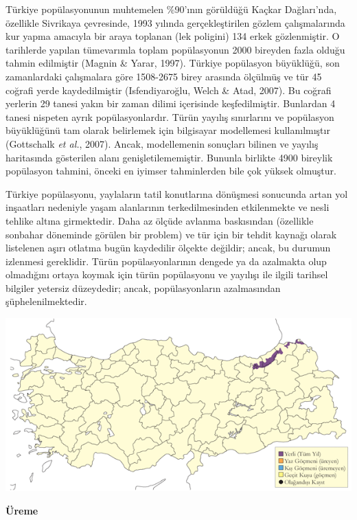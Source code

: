 \documentclass[
  a4paper,
  DIV=11,
  numbers=noendperiod]{scrreprt}
\begin{document}
Türkiye popülasyonunun muhtemelen \%90'ının görüldüğü Kaçkar
Dağları'nda, özellikle Sivrikaya çevresinde, 1993 yılında
gerçekleştirilen gözlem çalışmalarında kur yapma amacıyla bir araya
toplanan (lek poligini) 134 erkek gözlenmiştir. O tarihlerde yapılan
tümevarımla toplam popülasyonun 2000 bireyden fazla olduğu tahmin
edilmiştir (Magnin \& Yarar, 1997). Türkiye popülasyon büyüklüğü, son
zamanlardaki çalışmalara göre 1508-2675 birey arasında ölçülmüş ve tür
45 coğrafi yerde kaydedilmiştir (Isfendiyaroğlu, Welch \& Atad, 2007).
Bu coğrafi yerlerin 29 tanesi yakın bir zaman dilimi içerisinde
keşfedilmiştir. Bunlardan 4 tanesi nispeten ayrık popülasyonlardır.
Türün yayılış sınırlarını ve popülasyon büyüklüğünü tam olarak
belirlemek için bilgisayar modellemesi kullanılmıştır (Gottschalk
\emph{et al.}, 2007). Ancak, modellemenin sonuçları bilinen ve yayılış
haritasında gösterilen alanı genişletilememiştir. Bununla birlikte 4900
bireylik popülasyon tahmini, önceki en iyimser tahminlerden bile çok
yüksek olmuştur.

Türkiye popülasyonu, yaylaların tatil konutlarına dönüşmesi sonucunda
artan yol inşaatları nedeniyle yaşam alanlarının terkedilmesinden
etkilenmekte ve nesli tehlike altına girmektedir. Daha az ölçüde avlanma
baskısından (özellikle sonbahar döneminde görülen bir problem) ve tür
için bir tehdit kaynağı olarak listelenen aşırı otlatma bugün kaydedilir
ölçekte değildir; ancak, bu durumun izlenmesi gereklidir. Türün
popülasyonlarının dengede ya da azalmakta olup olmadığını ortaya koymak
için türün popülasyonu ve yayılışı ile ilgili tarihsel bilgiler yetersiz
düzeydedir; ancak, popülasyonların azalmasından şüphelenilmektedir.

\includegraphics{images/harita_Page_037.png}

\textbf{Üreme}
\end{document}
